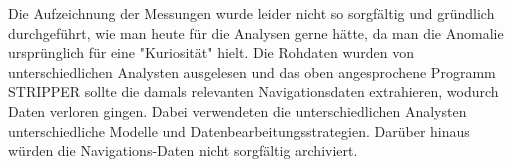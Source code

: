 Die Aufzeichnung der Messungen wurde leider nicht so sorgfältig und gründ\-lich durchgeführt, wie man heute für die Analysen gerne hätte, da man die Anomalie ursprünglich für eine "Kuriosität" hielt.\cite{Nieto2005}
Die Rohdaten wurden von unterschiedlichen Analysten ausgelesen und das oben angesprochene Programm STRIPPER sollte die damals relevanten Navigationsdaten extrahieren\cite{Nieto2005}, wodurch Daten verloren gingen. %
Dabei verwendeten die unterschiedlichen Analysten unterschiedliche Modelle und Datenbearbeitungsstrategien.\cite{Nieto2005}
Darüber hinaus würden die Navigations-Daten nicht sorgfältig archiviert.\cite{Nieto2005}




